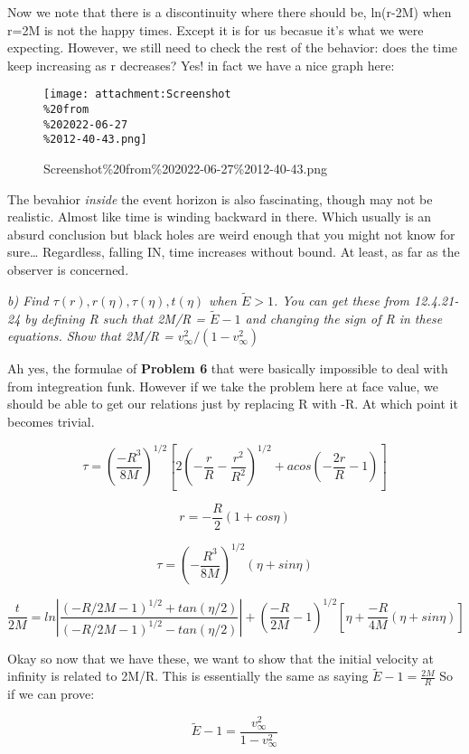 \documentclass[landscape,letterpaper,10pt,english]{article}
\begin{document}
    Now we note that there is a discontinuity where there should be,
ln(r-2M) when r=2M is not the happy times. Except it is for us becasue
it's what we were expecting. However, we still need to check the rest of
the behavior: does the time keep increasing as r decreases? Yes! in fact
we have a nice graph here:

\begin{figure}
\centering
\texttt{[image: attachment:Screenshot\\\%20from\\\%202022-06-27\\\%2012-40-43.png]}
\caption{Screenshot\%20from\%202022-06-27\%2012-40-43.png}
\end{figure}

    The bevahior \emph{inside} the event horizon is also fascinating, though
may not be realistic. Almost like time is winding backward in there.
Which usually is an absurd conclusion but black holes are weird enough
that you might not know for sure\ldots{} Regardless, falling IN, time
increases without bound. At least, as far as the observer is concerned.

    \emph{b) Find \(\tau(r), r(\eta), \tau(\eta), t(\eta)\) when
\(\tilde E > 1\). You can get these from 12.4.21-24 by defining R such
that 2M/R = \(\tilde E-1\) and changing the sign of R in these
equations. Show that 2M/R = \(v^2_\infty / (1-v^2_\infty)\)}

    Ah yes, the formulae of \textbf{Problem 6} that were basically
impossible to deal with from integreation funk. However if we take the
problem here at face value, we should be able to get our relations just
by replacing R with -R. At which point it becomes trivial.

\[ \tau = \left( \frac{-R^3}{8M} \right)^{1/2} \left[ 2 \left( -\frac{r}{R} - \frac{r^2}{R^2} \right)^{1/2} + acos \left( -\frac{2r}{R} - 1 \right) \right] \]

\[ r = -\frac{R}{2}(1+cos\eta) \]

\[ \tau = \left( -\frac{R^3}{8M} \right)^{1/2} (\eta + sin\eta) \]

\[ \frac{t}{2M} = ln\left| \frac{(-R/2M - 1)^{1/2}+tan(\eta/2)}{(-R/2M - 1)^{1/2}-tan(\eta/2)} \right| + \left( \frac{-R}{2M}-1 \right)^{1/2}\left[ \eta + \frac{-R}{4M}(\eta+sin\eta)\right]\]

    Okay so now that we have these, we want to show that the initial
velocity at infinity is related to 2M/R. This is essentially the same as
saying \(\tilde E - 1 = \frac{2M}{R}\) So if we can prove:

\[ \tilde E - 1 = \frac{v^2_\infty}{1-v^2_\infty} \]
\end{document}
